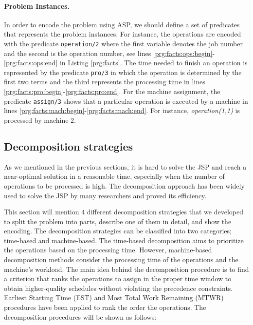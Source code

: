 \documentclass[runningheads]{llncs}
\begin{document}
\paragraph{Problem Instances.} 

In order to encode the problem using ASP, we should define a set of predicates that represents the problem instances. For instance, the operations are encoded with the predicate \lstinline{operation/2} where the first variable denotes the job number and the second is the operation number, see lines \ref{prg:facts:ops:begin}-\ref{prg:facts:ops:end} in Listing \ref{prg:facts}. The time needed to finish an operation is represented by the predicate \lstinline{pro/3} in which the operation is determined by the first two terms and the third represents the processing time in lines \ref{prg:facts:pro:begin}-\ref{prg:facts:pro:end}. For the machine assignment, the predicate \lstinline{assign/3} shows that a particular operation is executed by a machine in lines \ref{prg:facts:mach:begin}-\ref{prg:facts:mach:end}. For instance, \emph{operation(1,1)} is processed by machine 2. 


\subsection{Decomposition strategies}
As we mentioned in the previous sections, it is hard to solve the JSP and reach a near-optimal solution in a reasonable time, especially when the number of operations to be processed is high. The decomposition approach has been widely used to solve the JSP by many researchers and proved its efficiency.

This section will mention $4$ different decomposition strategies that we developed to split the problem into parts, describe one of them in detail, and show the encoding. The decomposition strategies can be classified into two categories; time-based and machine-based. The time-based decomposition aims to prioritize the operations based on the processing time. However, machine-based decomposition methods consider the processing time of the operations and the machine's workload. The main idea behind the decomposition procedure is to find a criterion that ranks the operations to assign in the proper time window to obtain higher-quality schedules without violating the precedence constraints. Earliest Starting Time (EST) and Most Total Work Remaining (MTWR) procedures have been applied to rank the order the operations. The decomposition procedures will be shown as follows:
\end{document}

